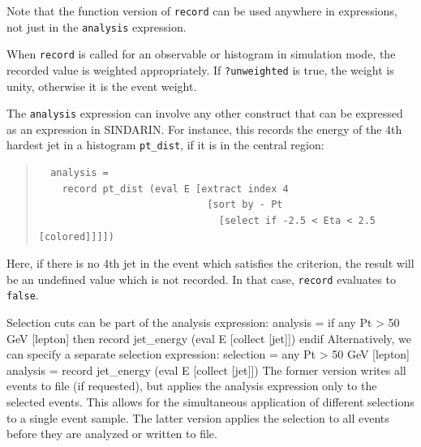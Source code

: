 \documentclass[12pt]{book}
\newenvironment{code}%
  {\begingroup\footnotesize
   \quote
   \verbatim}%
  {\endverbatim
   \endquote
   \endgroup\noindent}
\newcommand{\ttt}[1]{\texttt{#1}}
\begin{document}
Note that the function version of \ttt{record} can be used anywhere in
expressions, not just in the \ttt{analysis} expression.

When \ttt{record} is called for an observable or histogram in simulation mode,
the recorded value is weighted appropriately.  If \ttt{?unweighted} is true,
the weight is unity, otherwise it is the event weight.

The \ttt{analysis} expression can involve any other construct
that can be expressed as an expression in SINDARIN.  For instance, this
records the energy of the 4th hardest jet in a histogram \ttt{pt\_dist}, if it
is in the central region:
\begin{quote}
  \begin{footnotesize}
\begin{verbatim}
  analysis = 
    record pt_dist (eval E [extract index 4 
                             [sort by - Pt 
                               [select if -2.5 < Eta < 2.5 [colored]]]])
\end{verbatim}
  \end{footnotesize}
\end{quote}
Here, if there is no 4th jet in the event which satisfies the criterion, the
result will be an undefined value which is not recorded.  In that case,
\ttt{record} evaluates to \ttt{false}.

Selection cuts can be part of the analysis expression:
\begin{code}
  analysis =
    if any Pt > 50 GeV [lepton] then
      record jet_energy (eval E [collect [jet]])
    endif
\end{code}
Alternatively, we can specify a separate selection expression:
\begin{code}
  selection = any Pt > 50 GeV [lepton]
  analysis = record jet_energy (eval E [collect [jet]])
\end{code}
The former version writes all events to file (if requested), but
applies the analysis expression only to the selected events.  This
allows for the simultaneous application of different selections to a
single event sample.  The latter version applies the selection to all
events before they are analyzed or written to file.
\end{document}
